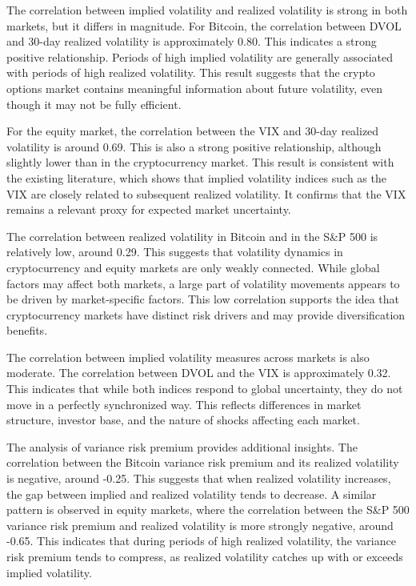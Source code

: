 \documentclass[11pt,a4paper,openany]{report}
\begin{document}
The correlation between implied volatility and realized volatility is
strong in both markets, but it differs in magnitude. For Bitcoin, the
correlation between DVOL and 30-day realized volatility is approximately
0.80. This indicates a strong positive relationship. Periods of high
implied volatility are generally associated with periods of high
realized volatility. This result suggests that the crypto options market
contains meaningful information about future volatility, even though it
may not be fully efficient.

For the equity market, the correlation between the VIX and 30-day
realized volatility is around 0.69. This is also a strong positive
relationship, although slightly lower than in the cryptocurrency market.
This result is consistent with the existing literature, which shows that
implied volatility indices such as the VIX are closely related to
subsequent realized volatility. It confirms that the VIX remains a
relevant proxy for expected market uncertainty.

The correlation between realized volatility in Bitcoin and in the S\&P
500 is relatively low, around 0.29. This suggests that volatility
dynamics in cryptocurrency and equity markets are only weakly connected.
While global factors may affect both markets, a large part of volatility
movements appears to be driven by market-specific factors. This low
correlation supports the idea that cryptocurrency markets have distinct
risk drivers and may provide diversification benefits.

The correlation between implied volatility measures across markets is
also moderate. The correlation between DVOL and the VIX is approximately
0.32. This indicates that while both indices respond to global
uncertainty, they do not move in a perfectly synchronized way. This
reflects differences in market structure, investor base, and the nature
of shocks affecting each market.

The analysis of variance risk premium provides additional insights. The
correlation between the Bitcoin variance risk premium and its realized
volatility is negative, around -0.25. This suggests that when realized
volatility increases, the gap between implied and realized volatility
tends to decrease. A similar pattern is observed in equity markets,
where the correlation between the S\&P 500 variance risk premium and
realized volatility is more strongly negative, around -0.65. This
indicates that during periods of high realized volatility, the variance
risk premium tends to compress, as realized volatility catches up with
or exceeds implied volatility.
\end{document}
